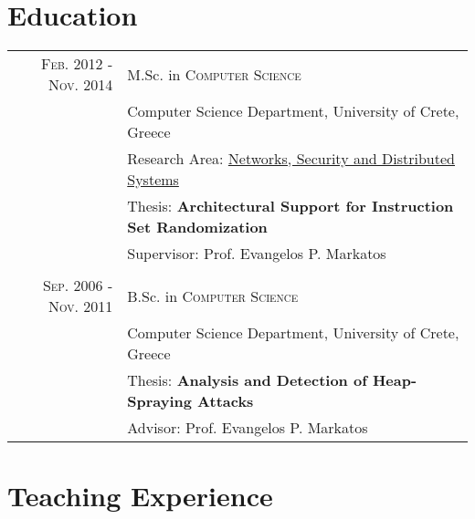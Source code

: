 \documentclass[a4paper,10pt]{article} %
\begin{document}

\section{Education}

\begin{tabular}{rl}	

\textsc{Feb. 2012 - Nov. 2014} & M.Sc. in \textsc{Computer Science} \\
& Computer Science Department, University of Crete, Greece \\
& Research Area: \href{https://www.csd.uoc.gr/CSD/index.jsp?content=research&lang=en&ri=5}{Networks, Security and Distributed Systems}\\
& Thesis: \textbf{Architectural Support for Instruction Set Randomization} \\
& Supervisor: Prof. Evangelos P. Markatos \\
\\

\textsc{Sep. 2006 - Nov. 2011} & B.Sc. in \textsc{Computer Science} \\
& Computer Science Department, University of Crete, Greece \\
& Thesis: \textbf{Analysis and Detection of Heap-Spraying Attacks} \\
& Advisor: Prof. Evangelos P. Markatos \\

\end{tabular}


\section{Teaching Experience}
\end{document}

